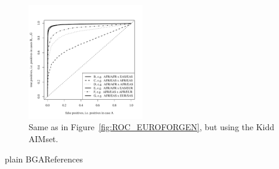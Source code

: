 \documentclass[12pt]{article}
\theoremstyle{definition}
\begin{document}
\begin{figure}[H]
  \begin{center}
    \includegraphics[width=0.45\textwidth]{roc-curve-Kidd.pdf}
  \end{center}
  \caption{Same as in Figure~\ref{fig:ROC_EUROFORGEN}, but using the
    Kidd AIMset.}
  \label{fig:ROC_Kidd} 
\end{figure}

{plain}
{BGA}{References}
\end{document}
